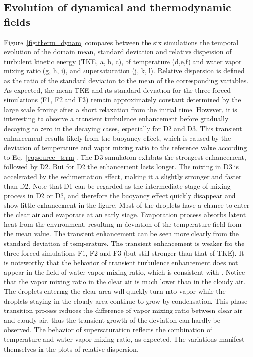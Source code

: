 \documentclass[draft,jgrga]{AGUTeX}
\newcommand{\Eq}[1]{Eq.~\eqref{#1}} \newcommand{\Fig}[1]{Figure~\ref{#1}}
\begin{document}
\begin{article}
\subsection{Evolution of dynamical and thermodynamic fields}
\Fig{fig:therm_dynam} compares between the six simulations the temporal evolution of the domain mean, standard deviation and relative dispersion of turbulent kinetic energy (TKE, a, b, c), of temperature (d,e,f) and water vapor mixing ratio (g, h, i), and supersaturation (j, k, l). Relative dispersion is defined as the ratio of the standard deviation to the mean of the corresponding variables. As expected, the mean TKE and its standard deviation for the three forced simulations (F1, F2 and F3) remain approximately constant determined by the large scale forcing after a short relaxation from the initial time. However, it is interesting to observe a transient turbulence enhancement before gradually decaying to zero in the decaying cases, especially for D2 and D3. This transient enhancement results likely from the buoyancy effect, which is caused by the deviation of temperature and vapor mixing ratio to the reference value according to \Eq{eq:source_term}. The D3 simulation exhibits the strongest enhancement, followed by D2. But for D2 the enhancement lasts longer. The mixing in D3 is accelerated by the sedimentation effect, making it a slightly stronger and faster than D2. Note that D1 can be regarded as the intermediate stage of mixing process in D2 or D3, and therefore the buoyancy effect quickly disappear and show little enhancement in the figure.  Most of the droplets have a chance to enter the clear air and evaporate at an early stage. Evaporation process absorbs latent heat from the environment, resulting in deviation of the temperature field from the mean value. The transient enhancement can be seen more clearly from the standard deviation of temperature. The transient enhancement is weaker for the three forced simulations F1, F2 and F3 (but still stronger than that of TKE).  It is noteworthy that the behavior of transient turbulence enhancement does not appear in the field of water vapor mixing ratio, which is consistent with \cite{Kumar14}. Notice that the vapor mixing ratio in the clear air is much lower than in the cloudy air. The droplets entering the clear area will quickly turn into vapor while the droplets staying in the cloudy area continue to grow by condensation. This phase transition process reduces the difference of vapor mixing ratio between clear air and cloudy air, thus the transient growth of the deviation can hardly be observed.  The behavior of supersaturation reflects the combination of temperature and water vapor mixing ratio, as expected. The variations manifest themselves in the plots of relative dispersion.


\end{article}
\end{document}
